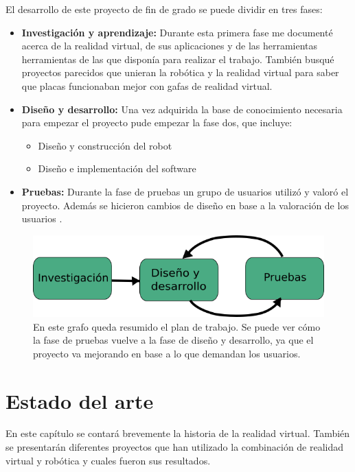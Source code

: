 \documentclass[twoside, 11pt]{epstfg}
\begin{document}
El desarrollo de este proyecto de fin de grado se puede dividir en tres fases:
\begin{itemize}
	\item \textbf{Investigación y aprendizaje:} Durante esta primera fase me documenté acerca de la realidad virtual, de sus aplicaciones y de las herramientas herramientas de las que disponía para realizar el trabajo. También busqué proyectos parecidos que unieran la robótica y la realidad virtual para saber que placas funcionaban mejor con gafas de realidad virtual.
	
	\item \textbf{Diseño y desarrollo:} Una vez adquirida la base de conocimiento necesaria para empezar el proyecto pude empezar la fase dos, que incluye:
	\begin{itemize}
		\item Diseño y construcción del robot
		\item Diseño e implementación del software
	\end{itemize}

	\item \textbf{Pruebas:} Durante la fase de pruebas un grupo de usuarios utilizó y valoró el proyecto. Además se hicieron cambios de diseño en base a la valoración de los usuarios .
\end{itemize}

\begin{figure}[H]
	\centerline{
		\mbox{\includegraphics[width=5.00in]{images/met.png}}
	}
	\caption{En este grafo queda resumido el plan de trabajo. Se puede ver cómo la fase de pruebas vuelve a la fase de diseño y desarrollo, ya que el proyecto va mejorando en base a lo que demandan los usuarios.}
	\label{plan}
\end{figure}


\chapter{Estado del arte}


En este capítulo se contará brevemente la historia de la realidad virtual.
También se presentarán diferentes proyectos que han utilizado la combinación de realidad virtual y robótica y cuales fueron sus resultados.
\end{document}
